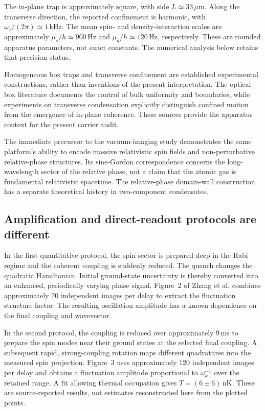 \documentclass[11pt,a4paper]{article}
\theoremstyle{definition}
\theoremstyle{remark}
\begin{document}
The in-plane trap is approximately square, with side $L\simeq33\,\mu\mathrm m$. Along the transverse direction, the reported confinement is harmonic, with $\omega_z/(2\pi)\simeq1\,\mathrm{kHz}$. The mean spin- and density-interaction scales are approximately $\mu_s/h\simeq900\,\mathrm{Hz}$ and $\mu_d/h\simeq120\,\mathrm{Hz}$, respectively. These are rounded apparatus parameters, not exact constants. The numerical analysis below retains that precision status.\cite{zhang2026}

Homogeneous box traps and transverse confinement are established experimental constructions, rather than inventions of the present interpretation. The optical-box literature documents the control of bulk uniformity and boundaries, while experiments on transverse condensation explicitly distinguish confined motion from the emergence of in-plane coherence. These sources provide the apparatus context for the present carrier audit.\cite{navon,chomaz}

The immediate precursor to the vacuum-imaging study demonstrates the same platform's ability to encode massive relativistic spin fields and non-perturbative relative-phase structures. Its sine-Gordon correspondence concerns the long-wavelength sector of the relative phase, not a claim that the atomic gas is fundamental relativistic spacetime. The relative-phase domain-wall construction has a separate theoretical history in two-component condensates.\cite{precursor,son}

\subsection{Amplification and direct-readout protocols are different}
In the first quantitative protocol, the spin sector is prepared deep in the Rabi regime and the coherent coupling is suddenly reduced. The quench changes the quadratic Hamiltonian. Initial ground-state uncertainty is thereby converted into an enhanced, periodically varying phase signal. Figure~2 of Zhang et al. combines approximately 70 independent images per delay to extract the fluctuation structure factor. The resulting oscillation amplitude has a known dependence on the final coupling and wavevector.\cite{zhang2026}

In the second protocol, the coupling is reduced over approximately $9\,\mathrm{ms}$ to prepare the spin modes near their ground states at the selected final coupling. A subsequent rapid, strong-coupling rotation maps different quadratures into the measured spin projection. Figure~3 uses approximately 120 independent images per delay and obtains a fluctuation amplitude proportional to $\omega_k^{-1}$ over the retained range. A fit allowing thermal occupation gives $T=(6\pm6)\,\mathrm{nK}$. These are source-reported results, not estimates reconstructed here from the plotted points.\cite{zhang2026}
\end{document}
